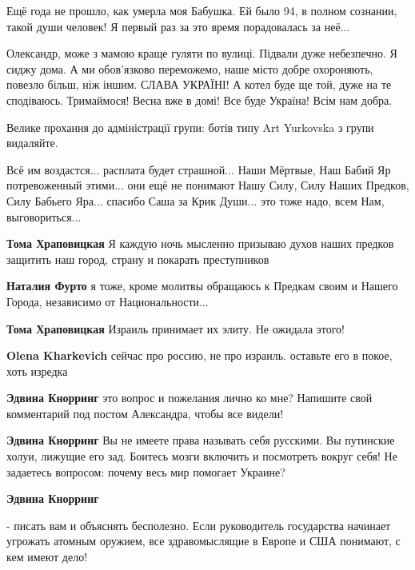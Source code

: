 \begin{itemize}

Ещё года не прошло, как умерла моя Бабушка. Ей было 94, в полном сознании,
такой души человек! Я первый раз за это время порадовалась за неё...


Олександр, може з мамою краще гуляти по вулиці. Підвали дуже небезпечно. Я сиджу
дома. А ми обов'язково переможемо, наше місто добре охороняють, повезло більш, ніж
іншим. СЛАВА УКРАЇНІ! А котел буде ще той, дуже на те сподіваюсь. Тримаймося! Весна
вже в домі! Все буде Україна! Всім нам добра.


Велике прохання до адміністрації групи: ботів типу Art Yurkovska з групи видаляйте.


Всё им воздастся... расплата будет страшной... Наши Мёртвые, Наш Бабий Яр
потревоженный этими... они ещё не понимают Нашу Силу, Силу Наших Предков, Силу
Бабьего Яра... спасибо Саша за Крик Души... это тоже надо, всем Нам,
выговориться...

\begin{itemize} %
\textbf{Тома Храповицкая} Я каждую ночь мысленно призываю духов наших предков защитить наш город, страну и покарать преступников

\textbf{Наталия Фурто} я тоже, кроме молитвы обращаюсь к Предкам своим и Нашего Города, независимо от Национальности...

\textbf{Тома Храповицкая} Израиль принимает их элиту. Не ожидала этого!

\textbf{Olena Kharkevich} сейчас про россию, не про израиль. оставьте его в покое, хоть изредка

\textbf{Эдвина Кнорринг} это вопрос и пожелания лично ко мне? Напишите свой комментарий под постом Александра, чтобы все видели!

\textbf{Эдвина Кнорринг} Вы не имеете права называть себя русскими. Вы путинские холуи, лижущие его зад. Боитесь мозги включить и посмотреть вокруг себя! Не задаетесь вопросом: почему весь мир помогает Украине?

\textbf{Эдвина Кнорринг} 

- писать вам и объяснять бесполезно. Если руководитель государства начинает
угрожать атомным оружием, все здравомыслящие в Европе и США понимают, с кем
имеют дело!


\end{itemize}
\end{itemize}
